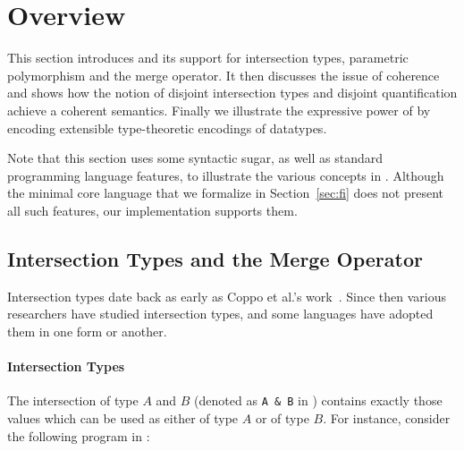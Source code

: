 \section{Overview} \label{sec:overview}

This section introduces \name and its support for intersection types,
parametric polymorphism and the merge operator. It then discusses
the issue of coherence and shows how the notion of disjoint
intersection types and disjoint quantification achieve a coherent semantics.
Finally we illustrate the expressive power of \name by encoding 
extensible type-theoretic encodings of datatypes.

Note that this section uses some syntactic sugar, as well as standard
programming language features, to illustrate the various concepts in
\name. Although the minimal core language that we formalize in
Section~\ref{sec:fi} does not present all such features, our implementation
supports them.



\begin{comment}
It then shows that,
with unrestricted intersection types, the system
lacks \emph{coherence}. This motivates the introduction of
disjoint intersection types and extending universal quatification to
disjoint quantification, which is enough to ensure coherence.
\end{comment}

\subsection{Intersection Types and the Merge Operator}

Intersection types date back as early as Coppo et
al.'s work~\cite{coppo1981functional}. Since then various researchers have
studied intersection types, and some languages have adopted them in one
form or another. 

\paragraph{Intersection Types}
The intersection of type $A$ and $B$ (denoted as \lstinline{A & B} in
\name) contains exactly those values
which can be used as either of type $A$ or of type $B$. For instance,
consider the following program in \name:

